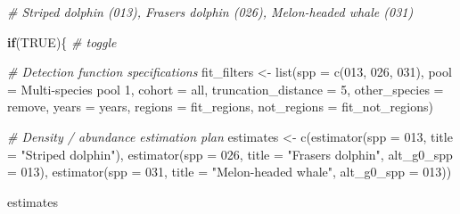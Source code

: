 \documentclass[
]{book}
\newenvironment{Shaded}{\begin{snugshade}}{\end{snugshade}}
\newcommand{\AttributeTok}[1]{\textcolor[rgb]{0.77,0.63,0.00}{#1}}
\newcommand{\CommentTok}[1]{\textcolor[rgb]{0.56,0.35,0.01}{\textit{#1}}}
\newcommand{\ConstantTok}[1]{\textcolor[rgb]{0.00,0.00,0.00}{#1}}
\newcommand{\ControlFlowTok}[1]{\textcolor[rgb]{0.13,0.29,0.53}{\textbf{#1}}}
\newcommand{\DecValTok}[1]{\textcolor[rgb]{0.00,0.00,0.81}{#1}}
\newcommand{\FunctionTok}[1]{\textcolor[rgb]{0.00,0.00,0.00}{#1}}
\newcommand{\NormalTok}[1]{#1}
\newcommand{\OtherTok}[1]{\textcolor[rgb]{0.56,0.35,0.01}{#1}}
\newcommand{\StringTok}[1]{\textcolor[rgb]{0.31,0.60,0.02}{#1}}
\begin{document}
\begin{Shaded}
\begin{Highlighting}[]
\CommentTok{\# Striped dolphin (013), Fraser\textquotesingle{}s dolphin (026), Melon{-}headed whale (031)}

\ControlFlowTok{if}\NormalTok{(}\ConstantTok{TRUE}\NormalTok{)\{ }\CommentTok{\# toggle}

  \CommentTok{\# Detection function specifications}
\NormalTok{  fit\_filters }\OtherTok{\textless{}{-}}
    \FunctionTok{list}\NormalTok{(}\AttributeTok{spp =} \FunctionTok{c}\NormalTok{(}\StringTok{\textquotesingle{}013\textquotesingle{}}\NormalTok{, }\StringTok{\textquotesingle{}026\textquotesingle{}}\NormalTok{, }\StringTok{\textquotesingle{}031\textquotesingle{}}\NormalTok{),}
         \AttributeTok{pool =} \StringTok{\textquotesingle{}Multi{-}species pool 1\textquotesingle{}}\NormalTok{,}
         \AttributeTok{cohort =} \StringTok{\textquotesingle{}all\textquotesingle{}}\NormalTok{,}
         \AttributeTok{truncation\_distance =} \DecValTok{5}\NormalTok{,}
         \AttributeTok{other\_species =} \StringTok{\textquotesingle{}remove\textquotesingle{}}\NormalTok{,}
         \AttributeTok{years =}\NormalTok{ years,}
         \AttributeTok{regions =}\NormalTok{ fit\_regions,}
         \AttributeTok{not\_regions =}\NormalTok{ fit\_not\_regions)}

  \CommentTok{\# Density / abundance estimation plan}
\NormalTok{  estimates }\OtherTok{\textless{}{-}}
    \FunctionTok{c}\NormalTok{(}\FunctionTok{estimator}\NormalTok{(}\AttributeTok{spp =} \StringTok{\textquotesingle{}013\textquotesingle{}}\NormalTok{, }\AttributeTok{title =} \StringTok{"Striped dolphin"}\NormalTok{),}
      \FunctionTok{estimator}\NormalTok{(}\AttributeTok{spp =} \StringTok{\textquotesingle{}026\textquotesingle{}}\NormalTok{, }\AttributeTok{title =} \StringTok{"Fraser\textquotesingle{}s dolphin"}\NormalTok{, }\AttributeTok{alt\_g0\_spp =} \StringTok{\textquotesingle{}013\textquotesingle{}}\NormalTok{),}
      \FunctionTok{estimator}\NormalTok{(}\AttributeTok{spp =} \StringTok{\textquotesingle{}031\textquotesingle{}}\NormalTok{, }\AttributeTok{title =} \StringTok{"Melon{-}headed whale"}\NormalTok{, }\AttributeTok{alt\_g0\_spp =} \StringTok{\textquotesingle{}013\textquotesingle{}}\NormalTok{))}
  
\NormalTok{  estimates}
  

\end{Highlighting}
\end{Shaded}
\end{document}
